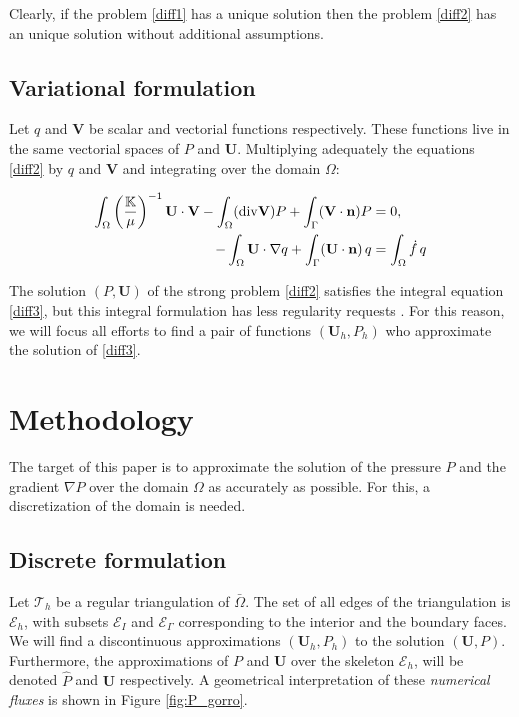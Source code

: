 \documentclass[review]{elsarticle}
\def\dd{{\rm div}}
\def\gp{{\nabla P}}
\def\nn{\textbf{n}}
\def\unn{\textbf{U}}
\def\vnn{\textbf{V}}
\def\esq{\mathcal{E}}
\begin{document}
Clearly, if the problem \eqref{diff1} has a unique solution then the problem \eqref{diff2} has an unique solution without additional assumptions.

\subsection{Variational formulation}
Let $q$ and $\vnn$ be scalar and vectorial functions respectively. These functions live in the same vectorial spaces of $P$ and $\unn$.  Multiplying adequately the equations \eqref{diff2} by $q$ and $\vnn$ and integrating over the domain $\Omega$:

\begin{equation}\label{diff3}
\begin{aligned} 
\int_{\Omega} \left( \frac{\mathbb{K}}{\mu} \right) ^{-1} \unn \cdot \vnn  - \int_{\Omega}   (\dd\vnn)P +  \int_{\Gamma}(\vnn\cdot\nn)P &= 0,\\
- \int_{\Omega} \unn\cdot \nabla q 		+
\int_{\Gamma} ({\unn}\cdot\nn)\,q &= \int_{\Omega} \dot{f}\,q		
\end{aligned}
\end{equation}

The solution $(P,\unn)$ of the strong problem \eqref{diff2} satisfies the integral equation \eqref{diff3}, but this integral formulation has less regularity requests \cite{gatica2014simple}.  For this reason, we will focus all efforts to find a pair of functions  $(\unn_h,P_h)$ who approximate the solution of \eqref{diff3}. 

\section{Methodology}

The target of this paper is to approximate the solution of the pressure $P$ and the gradient $\gp$ over the domain $\Omega$ as accurately as possible. For this, a discretization of the domain is needed.

\subsection{Discrete formulation}

Let $\mathcal{T}_h  $ be a regular triangulation of $\bar{\Omega}$. The set of all edges of the triangulation is $\esq_h$, with subsets $\esq_I$ and $\esq_{\Gamma}$ corresponding to the interior and the boundary faces.
We will find a discontinuous approximations $(\unn_h,P_h)$ to the solution $(\unn,P)$. Furthermore, the approximations of $P$ and $\unn$ over the skeleton $\esq_h$, will be denoted $\hat{P}$ and $\hat{\unn}$ respectively. A geometrical interpretation of these \textit{numerical fluxes} is shown in Figure \ref{fig:P_gorro}.
\end{document}
